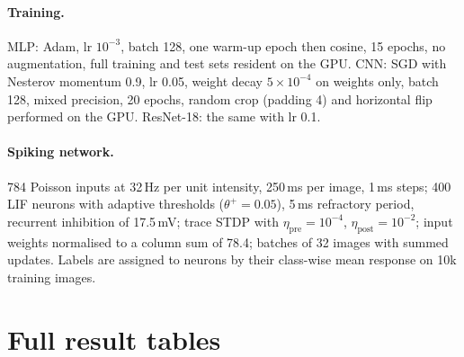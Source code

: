 \documentclass[11pt]{article}
\begin{document}
\paragraph{Training.} MLP: Adam, lr $10^{-3}$, batch 128, one warm-up epoch then cosine, 15 epochs, no augmentation, full
training and test sets resident on the GPU. CNN: SGD with Nesterov momentum 0.9, lr 0.05, weight decay $5\times10^{-4}$ on
weights only, batch 128, mixed precision, 20 epochs, random crop (padding 4) and horizontal flip performed on the GPU.
ResNet-18: the same with lr 0.1.

\paragraph{Spiking network.} 784 Poisson inputs at 32\,Hz per unit intensity, 250\,ms per image, 1\,ms steps; 400 LIF
neurons with adaptive thresholds ($\theta^+=0.05$), 5\,ms refractory period, recurrent inhibition of 17.5\,mV; trace STDP with
$\eta_\mathrm{pre}=10^{-4}$, $\eta_\mathrm{post}=10^{-2}$; input weights normalised to a column sum of 78.4; batches of 32
images with summed updates. Labels are assigned to neurons by their class-wise mean response on 10k training images.

\section{Full result tables}
\label{app:tables}

\end{document}
